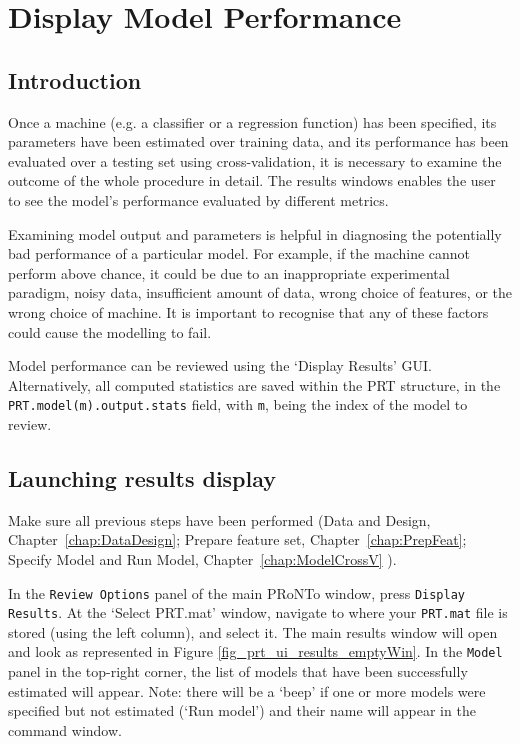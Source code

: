 %


\chapter{Display Model Performance}
\label{chap:DisRes}
\minitoc

\section{Introduction}

Once a machine (e.g. a classifier or a regression function) has been specified, 
its parameters have been estimated over training data, and its performance has been
evaluated over a testing set using cross-validation, it is necessary to examine the outcome
of the whole procedure in detail. The results windows enables the user to see the model's performance evaluated by different metrics.

Examining model output and parameters is helpful in diagnosing the potentially
bad performance of a particular model. For example, if the machine cannot perform above
chance, it could be due to an inappropriate experimental paradigm, noisy data, insufficient
amount of data, wrong choice of features,  or the wrong choice of machine. It is important to
recognise that any of these factors could cause the modelling to fail. 

Model performance can be reviewed using the `Display Results' GUI. Alternatively, all computed statistics are saved within the PRT structure, in the \texttt{PRT.model(m).output.stats} field, with \texttt{m}, being the index of the model to review.

\section{Launching results display}

Make sure all previous steps have been performed (Data and Design, Chapter~\ref{chap:DataDesign};
Prepare feature set, Chapter~\ref{chap:PrepFeat}; Specify Model and Run Model, Chapter~\ref{chap:ModelCrossV} ).

In the {\tt Review Options} panel of the main PRoNTo window, press {\tt Display Results}. At the `Select PRT.mat' window, navigate to where your {\tt PRT.mat} file is stored (using the left column), and select it. The main results window will open and look as represented in Figure \ref{fig_prt_ui_results_emptyWin}. In the {\tt Model} panel in the top-right corner, the list of models that have been successfully estimated will appear. Note: there will be a `beep' if one or more models were specified but not estimated (`Run model') and their name will appear in the command window.

